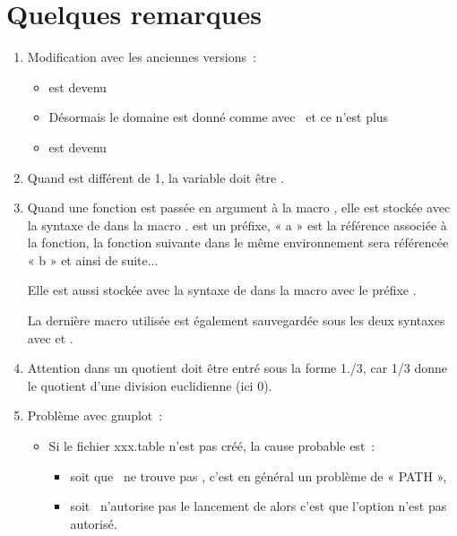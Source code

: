 \section{Quelques remarques}

\begin{enumerate}
\item Modification avec les anciennes versions~:
  \begin{itemize}
   \item {} est devenu 
   \item Désormais le domaine est donné comme avec \TIKZ\ et ce n'est plus
   \item {} est devenu 
  \end{itemize}

\item  Quand  est différent de 1, la variable doit être .
\item Quand une fonction est passée en argument à la macro , elle est stockée avec la syntaxe de  dans la macro .  est un préfixe, « a » est la référence associée à la fonction, la fonction suivante dans le même environnement  sera référencée « b » et ainsi de suite...

Elle est aussi stockée avec la syntaxe de  dans la macro   avec le préfixe .

La dernière macro utilisée est également sauvegardée sous les deux syntaxes  avec    et .
\item Attention dans  un quotient doit être entré sous la forme 1./3, car 1/3 donne le quotient d'une division euclidienne (ici 0).
\item Problème avec gnuplot~:
  \begin{itemize}
   \item Si le fichier xxx.table n'est pas créé, la cause probable est~:
     \begin{itemize}
     \item  soit que \TEX\ ne trouve pas , c'est en général un problème de « PATH »,
     \item  soit \TEX\  n'autorise pas le lancement de  alors c'est que l'option  n'est pas autorisé.
    \end{itemize}


\end{itemize}
\end{enumerate}
